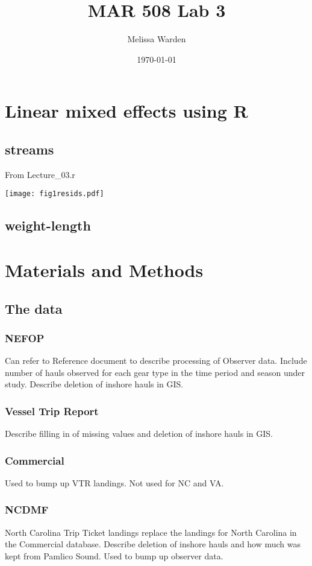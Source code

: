 \documentclass{article}
\title{MAR 508 Lab 3}
\author{Melissa Warden}
\date{\today}
\begin{document}
\maketitle
   
\section{Linear mixed effects using R}
\subsection{streams}

From Lecture\_03.r

\texttt{[image: fig1resids.pdf]}

\subsection{weight-length}

\section{Materials and Methods}
\subsection{The data}
\subsubsection{NEFOP}
Can refer to Reference document to describe processing of Observer data. Include number of hauls observed for each gear type in the time period and season under study. Describe deletion of inshore hauls in GIS.
\subsubsection{Vessel Trip Report}
Describe filling in of missing values and deletion of inshore hauls in GIS.
\subsubsection{Commercial}
Used to bump up VTR landings. Not used for NC and VA.
\subsubsection{NCDMF}
North Carolina Trip Ticket landings replace the landings for North Carolina in the Commercial database. Describe deletion of inshore hauls and how much was kept from Pamlico Sound. Used to bump up observer data.
\end{document}
